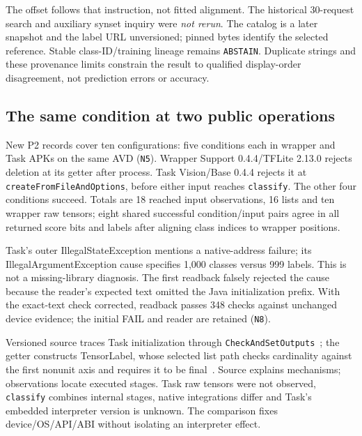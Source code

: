 \documentclass[10pt,conference]{IEEEtran}
\newcommand{\code}[1]{\texttt{#1}}
\begin{document}
The offset follows that instruction, not fitted alignment. The historical 30-request search and auxiliary synset inquiry were \emph{not rerun}. The catalog is a later snapshot and the label URL unversioned; pinned bytes identify the selected reference. Stable class-ID/training lineage remains \code{ABSTAIN}. Duplicate strings and these provenance limits constrain the result to qualified display-order disagreement, not prediction errors or accuracy.

\subsection{The same condition at two public operations}
\label{sec:consumers}
New P2 records cover ten configurations: five conditions each in wrapper and Task APKs on the same AVD (\code{N5}). Wrapper Support 0.4.4/TFLite 2.13.0 rejects deletion at its getter after process. Task Vision/Base 0.4.4 rejects it at \code{createFromFileAndOptions}, before either input reaches \code{classify}. The other four conditions succeed. Totals are 18 reached input observations, 16 lists and ten wrapper raw tensors; eight shared successful condition/input pairs agree in all returned score bits and labels after aligning class indices to wrapper positions.

Task's outer IllegalStateException mentions a native-address failure; its IllegalArgumentException cause specifies 1,000 classes versus 999 labels. This is not a missing-library diagnosis. The first readback falsely rejected the cause because the reader's expected text omitted the Java initialization prefix. With the exact-text check corrected, readback passes 348 checks against unchanged device evidence; the initial FAIL and reader are retained (\code{N8}).

Versioned source traces Task initialization through \code{CheckAndSetOutputs}~\cite{task-classifier}; the getter constructs TensorLabel, whose selected list path checks cardinality against the first nonunit axis and requires it to be final~\cite{tensorlabel}. Source explains mechanisms; observations locate executed stages. Task raw tensors were not observed, \code{classify} combines internal stages, native integrations differ and Task's embedded interpreter version is unknown. The comparison fixes device/OS/API/ABI without isolating an interpreter effect.
\end{document}
